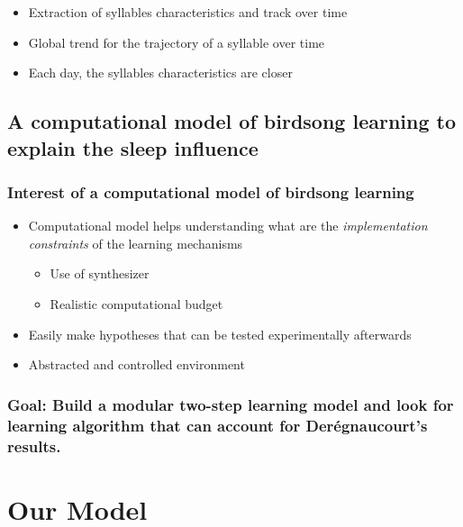 \begin{itemize}
\tightlist
\item
  Extraction of syllables characteristics and track over time
\item
  Global trend for the trajectory of a syllable over time
\item
  Each day, the syllables characteristics are closer
\end{itemize}

\section{A computational model of birdsong learning to explain the sleep
influence}\label{a-computational-model-of-birdsong-learning-to-explain-the-sleep-influence}

\subsection{Interest of a computational model of birdsong
learning}\label{interest-of-a-computational-model-of-birdsong-learning}

\begin{itemize}
\tightlist
\item
  Computational model helps understanding what are the
  \emph{implementation constraints} of the learning mechanisms

  \begin{itemize}
  \tightlist
  \item
    Use of synthesizer
  \item
    Realistic computational budget
  \end{itemize}
\item
  Easily make hypotheses that can be tested experimentally afterwards
\item
  Abstracted and controlled environment
\end{itemize}

\subsection{Goal: Build a modular two-step learning model and look for
learning algorithm that can account for Derégnaucourt's
results.}\label{goal-build-a-modular-two-step-learning-model-and-look-for-learning-algorithm-that-can-account-for-deruxe9gnaucourts-results.}

\chapter{Our Model}\label{our-model}

